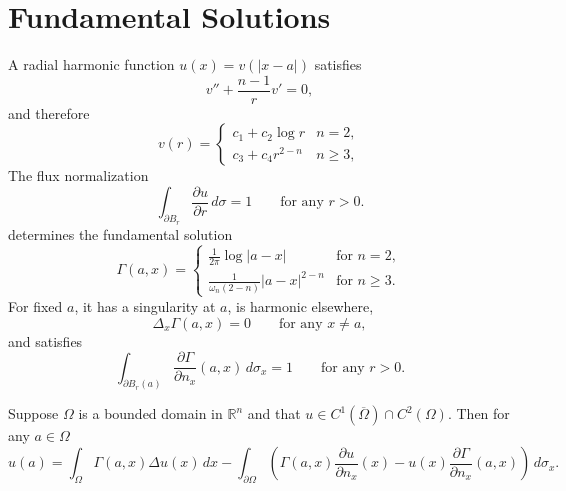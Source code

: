 \section{Fundamental Solutions}

A radial harmonic function $u(x)=v(|x-a|)$ satisfies
\begin{equation*}
v'' + \frac{n-1}{r}v' = 0,
\end{equation*}
and therefore
\begin{equation*}
v(r) =
\begin{cases}
c_1 + c_2 \log r & n = 2,\\
c_3 + c_4 r^{2-n} & n \ge 3,
\end{cases}
\end{equation*}
The flux normalization
\begin{equation*}
\int_{\partial B_r} \frac{\partial u}{\partial r}\, d\sigma = 1 \qquad \text{for any } r > 0.
\end{equation*}
determines the fundamental solution
\begin{equation*}
\Gamma(a,x) =
\begin{cases}
\frac{1}{2\pi}\log |a - x| & \text{for } n = 2,\\
\frac{1}{\omega_n(2-n)}|a - x|^{2-n} & \text{for } n \ge 3.
\end{cases}
\end{equation*}
For fixed $a$, it has a singularity at $a$, is harmonic elsewhere,
\begin{equation*}
\Delta_x \Gamma(a,x) = 0 \qquad \text{for any } x \ne a,
\end{equation*}
and satisfies
\begin{equation*}
\int_{\partial B_r(a)} \frac{\partial \Gamma}{\partial n_x}(a,x)\, d\sigma_x = 1 \qquad \text{for any } r > 0.
\end{equation*}

\begin{theorem}\label{hanlin:thm-green-identity}
Suppose $\Omega$ is a bounded domain in $\mathbb{R}^n$ and that
$u \in C^1(\overline{\Omega}) \cap C^2(\Omega)$. Then for any $a \in \Omega$
\[
u(a) = \int_{\Omega} \Gamma(a,x)\Delta u(x)\,dx
- \int_{\partial \Omega}
\left(\Gamma(a,x)\frac{\partial u}{\partial n_x}(x)
- u(x)\frac{\partial \Gamma}{\partial n_x}(a,x)\right)\,d\sigma_x.
\]
\end{theorem}

